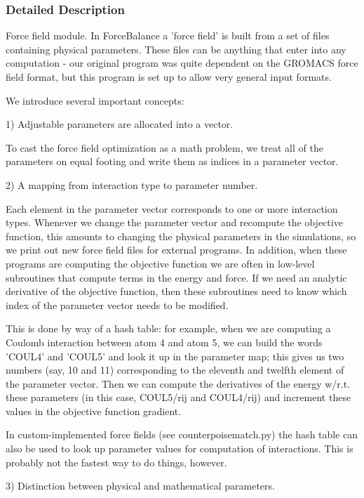 \subsubsection{Detailed Description}
Force field module. In Force\-Balance a 'force field' is built from a set of files containing physical parameters. These files can be anything that enter into any computation -\/ our original program was quite dependent on the G\-R\-O\-M\-A\-C\-S force field format, but this program is set up to allow very general input formats.

We introduce several important concepts\-:

1) Adjustable parameters are allocated into a vector.

To cast the force field optimization as a math problem, we treat all of the parameters on equal footing and write them as indices in a parameter vector.

2) A mapping from interaction type to parameter number.

Each element in the parameter vector corresponds to one or more interaction types. Whenever we change the parameter vector and recompute the objective function, this amounts to changing the physical parameters in the simulations, so we print out new force field files for external programs. In addition, when these programs are computing the objective function we are often in low-\/level subroutines that compute terms in the energy and force. If we need an analytic derivative of the objective function, then these subroutines need to know which index of the parameter vector needs to be modified.

This is done by way of a hash table\-: for example, when we are computing a Coulomb interaction between atom 4 and atom 5, we can build the words 'C\-O\-U\-L4' and 'C\-O\-U\-L5' and look it up in the parameter map; this gives us two numbers (say, 10 and 11) corresponding to the eleventh and twelfth element of the parameter vector. Then we can compute the derivatives of the energy w/r.\-t. these parameters (in this case, C\-O\-U\-L5/rij and C\-O\-U\-L4/rij) and increment these values in the objective function gradient.

In custom-\/implemented force fields (see counterpoisematch.\-py) the hash table can also be used to look up parameter values for computation of interactions. This is probably not the fastest way to do things, however.

3) Distinction between physical and mathematical parameters.

